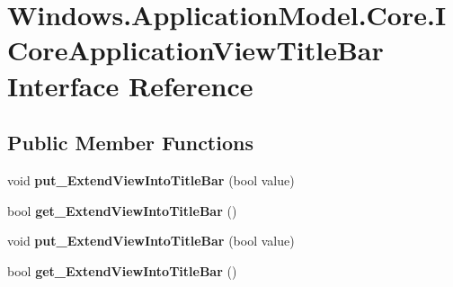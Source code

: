 \hypertarget{interface_windows_1_1_application_model_1_1_core_1_1_i_core_application_view_title_bar}{}\section{Windows.\+Application\+Model.\+Core.\+I\+Core\+Application\+View\+Title\+Bar Interface Reference}
\label{interface_windows_1_1_application_model_1_1_core_1_1_i_core_application_view_title_bar}
\subsection*{Public Member Functions}
\begin{DoxyCompactItemize}
\item 
\mbox{\label{interface_windows_1_1_application_model_1_1_core_1_1_i_core_application_view_title_bar_a7a2a4e4f4defc497bd88c834148e4602}} 
void {\bfseries put\+\_\+\+Extend\+View\+Into\+Title\+Bar} (bool value)
\item 
\mbox{\label{interface_windows_1_1_application_model_1_1_core_1_1_i_core_application_view_title_bar_a4fbd4def95c784d83117d955369996d6}} 
bool {\bfseries get\+\_\+\+Extend\+View\+Into\+Title\+Bar} ()
\item 
\mbox{\label{interface_windows_1_1_application_model_1_1_core_1_1_i_core_application_view_title_bar_a7a2a4e4f4defc497bd88c834148e4602}} 
void {\bfseries put\+\_\+\+Extend\+View\+Into\+Title\+Bar} (bool value)
\item 
\mbox{\label{interface_windows_1_1_application_model_1_1_core_1_1_i_core_application_view_title_bar_a4fbd4def95c784d83117d955369996d6}} 
bool {\bfseries get\+\_\+\+Extend\+View\+Into\+Title\+Bar} ()
\item 
\mbox{\label{interface_windows_1_1_application_model_1_1_core_1_1_i_core_application_view_title_bar_a7a2a4e4f4defc497bd88c834148e4602}} 

\end{DoxyCompactItemize}
